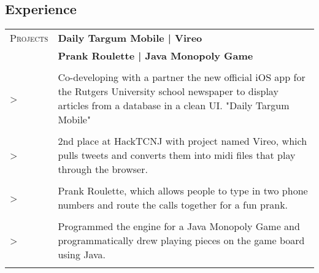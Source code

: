 \documentclass[a4paper, oneside, final]{scrartcl} %
\newcommand{\gray}{\rowcolor[gray]{.90}} %
\begin{document}
\begin{center}


\section{Experience}

\begin{tabularx}{0.97\linewidth}{>{\raggedleft\scshape}p{2cm}X}
\gray Projects & \textbf{Daily Targum Mobile | Vireo}\\
\gray & \textbf{Prank Roulette | Java Monopoly Game}\\
\\
  >& Co-developing with a partner the new official iOS app for the Rutgers University school newspaper to display articles from a database in a clean UI.  "Daily Targum Mobile" \\ \\
  >& 2nd place at HackTCNJ with project named Vireo, which pulls tweets and converts them into midi files that play through the browser.\\ \\
  >& Prank Roulette, which allows people to type in two phone numbers and route the calls together for a fun prank. \\ \\
  >& Programmed the engine for a Java Monopoly Game and programmatically drew playing pieces on the game board using Java. \\ \\
\end{tabularx}


\end{center}
\end{document}

